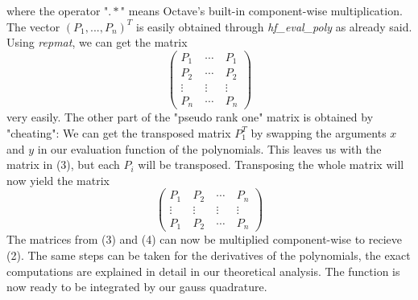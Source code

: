 where the operator "$.*$" means Octave's built-in component-wise multiplication. The vector $(P_1,...,P_n)^T$ is easily obtained through \textit{hf\_eval\_poly} as already said. Using \textit{repmat}, we can get the matrix
\begin{equation}\begin{pmatrix} P_1 &\ \cdots &\ P_1 \\
				   P_2 &\ \cdots &\ P_2 \\
				   \vdots &\ \vdots &\ \vdots \\ 
                   P_n &\ \cdots &\ P_n \end{pmatrix}\end{equation}
very easily. The other part of the "pseudo rank one" matrix is obtained by "cheating": We can get the transposed matrix $P_1^T$ by swapping the arguments $x$ and $y$ in our evaluation function of the polynomials. This leaves us with the matrix in (3), but each $P_i$ will be transposed. Transposing the whole matrix will now yield the matrix
\begin{equation}\begin{pmatrix} P_1 &\ P_2 &\ \cdots &\ P_n \\
				   \vdots &\ \vdots &\ \vdots &\ \vdots \\ 
                   P_1 &\ P_2 &\ \cdots &\ P_n \end{pmatrix}\end{equation}
The matrices from (3) and (4) can now be multiplied component-wise to recieve (2). The same steps can be taken for the derivatives of the polynomials, the exact computations are explained in detail in our theoretical analysis. The function is now ready to be integrated by our gauss quadrature.
